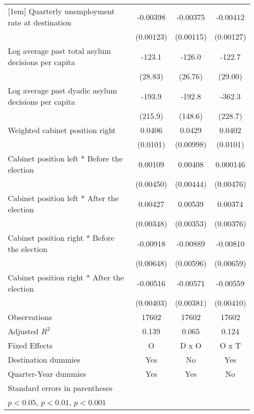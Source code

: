 \begin{table}[htbp]
\begin{tabular}{l*{3}{c}}
[1em]
Quarterly unemployment rate at destination&    -0.00398\sym{**} &    -0.00375\sym{**} &    -0.00412\sym{**} \\
                    &   (0.00123)         &   (0.00115)         &   (0.00127)         \\
[1em]
Log average past total asylum decisions per capita&      -123.1\sym{***}&      -126.0\sym{***}&      -122.7\sym{***}\\
                    &     (28.83)         &     (26.76)         &     (29.00)         \\
[1em]
Log average past dyadic asylum decisions per capita&      -193.9         &      -192.8         &      -362.3         \\
                    &     (215.9)         &     (148.6)         &     (228.7)         \\
[1em]
Weighted cabinet position right&      0.0406\sym{***}&      0.0429\sym{***}&      0.0402\sym{***}\\
                    &    (0.0101)         &   (0.00998)         &    (0.0101)         \\
[1em]
Cabinet position left * Before the election&     0.00109         &     0.00408         &    0.000146         \\
                    &   (0.00450)         &   (0.00444)         &   (0.00476)         \\
[1em]
Cabinet position left * After the election&     0.00427         &     0.00539         &     0.00374         \\
                    &   (0.00348)         &   (0.00353)         &   (0.00376)         \\
[1em]
Cabinet position right * Before the election&    -0.00918         &    -0.00889         &    -0.00810         \\
                    &   (0.00648)         &   (0.00596)         &   (0.00659)         \\
[1em]
Cabinet position right * After the election&    -0.00516         &    -0.00571         &    -0.00559         \\
                    &   (0.00403)         &   (0.00381)         &   (0.00410)         \\
\hline
Observations        &       17602         &       17602         &       17602         \\
Adjusted \(R^{2}\)  &       0.139         &       0.065         &       0.124         \\
Fixed Effects       &           O         &       D x O         &       O x T         \\
Destination dummies &         Yes         &          No         &         Yes         \\
Quarter-Year dummies&         Yes         &         Yes         &          No         \\
\hline\hline
\multicolumn{4}{l}{\footnotesize Standard errors in parentheses}\\
\multicolumn{4}{l}{\footnotesize \sym{*} \(p<0.05\), \sym{**} \(p<0.01\), \sym{***} \(p<0.001\)}\\
\end{tabular}
\end{table}
